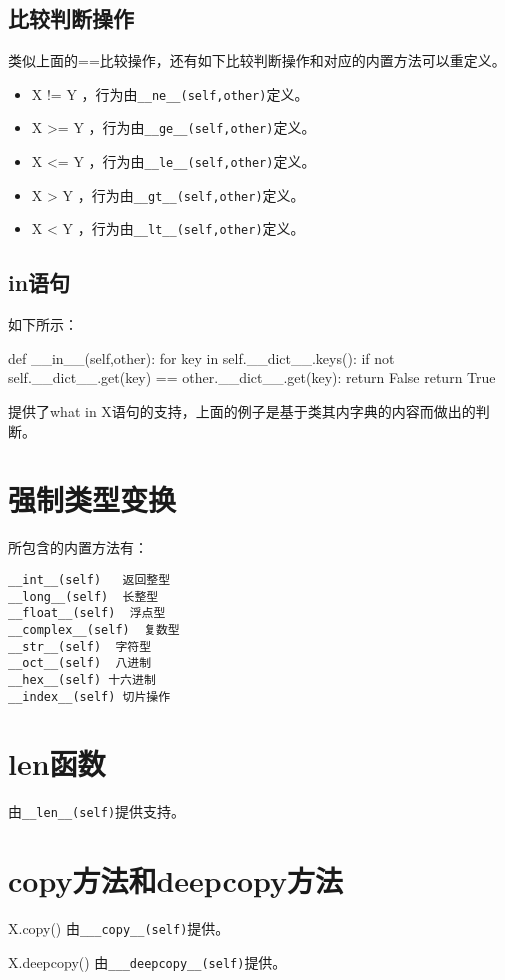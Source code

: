 \documentclass[12pt,oneside]{book}
\begin{document}
\begin{common-format}
\subsection{比较判断操作}
类似上面的==比较操作，还有如下比较判断操作和对应的内置方法可以重定义。
\begin{itemize}
\item X != Y ，行为由\verb+__ne__(self,other)+定义。
\item X >= Y ，行为由\verb+__ge__(self,other)+定义。
\item X <= Y ，行为由\verb+__le__(self,other)+定义。
\item X > Y ，行为由\verb+__gt__(self,other)+定义。
\item X < Y ，行为由\verb+__lt__(self,other)+定义。
\end{itemize}


\subsection{in语句}
如下所示：
\begin{tcbpython}[]
    def __in__(self,other):
        for key in self.__dict__.keys():
            if not self.__dict__.get(key) == other.__dict__.get(key):
                return False
        return True
\end{tcbpython}
提供了what in X语句的支持，上面的例子是基于类其内字典的内容而做出的判断。

\section{强制类型变换}
所包含的内置方法有：
\begin{Verbatim}
__int__(self)   返回整型
__long__(self)  长整型
__float__(self)  浮点型
__complex__(self)  复数型
__str__(self)  字符型
__oct__(self)  八进制
__hex__(self) 十六进制
__index__(self) 切片操作
\end{Verbatim}


\section{len函数}
由\verb+__len__(self)+提供支持。

\section{copy方法和deepcopy方法}
X.copy()  由\verb+___copy__(self)+提供。

X.deepcopy()  由\verb+___deepcopy__(self)+提供。

\end{common-format}
\end{document}
